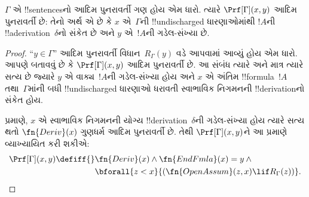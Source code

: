 \documentclass[../../../include/open-logic-section]{subfiles}
\begin{document}
\begin{prop}
  $\Gamma$ એ !!{sentence}sનો આદિમ
  પુનરાવર્તી ગણ હોય એમ ધારો.
  ત્યારે $\Prf[\Gamma](x, y)$ આદિમ
  પુનરાવર્તી છે: તેનો અર્થ એ છે કે
  $x$ એ~$\Gamma$ની
  !!{undischarged} ધારણાઓમાંથી
  $!A$ની !!a{derivation}~$\delta$નો
  સંકેત છે અને $y$ એ~$!A$ની
  ગડેલ-સંખ્યા છે.
\end{prop}

\begin{proof}
  ``$y \in \Gamma$'' આદિમ પુનરાવર્તી
  વિધાન~$R_\Gamma(y)$ વડે આપવામાં
  આવ્યું હોય એમ ધારો. આપણે બતાવવું છે
  કે $\Prf[\Gamma](x, y)$ આદિમ
  પુનરાવર્તી છે. આ સંબંધ ત્યારે અને
  માત્ર ત્યારે સત્ય છે જ્યારે $y$ એ
  વાક્ય~$!A$ની ગડેલ-સંખ્યા હોય અને
  $x$ એ અંતિમ !!{formula}~$!A$
  તથા~$\Gamma$માંની બધી
  !!{undischarged} ધારણાઓ ધરાવતી
  સ્વાભાવિક નિગમનની
  !!{derivation}નો સંકેત હોય.

   પ્રમાણે, $x$ એ
  સ્વાભાવિક નિગમનની યોગ્ય
  !!{derivation}~$\delta$ની ગડેલ-સંખ્યા
  હોય ત્યારે સત્ય થતો
  $\fn{Deriv}(x)$ ગુણધર્મ આદિમ
  પુનરાવર્તી છે. તેથી
  $\Prf[\Gamma](x, y)$ને આ પ્રમાણે
  વ્યાખ્યાયિત કરી શકીએ:
  \begin{align*}
    \Prf[\Gamma](x, y) \defiff {}
    & \fn{Deriv}(x) \land \fn{EndFmla}(x) = y \land {} \\
    & \bforall{z < x}{(\fn{OpenAssum}(z, x) \lif R_\Gamma(z))}.
  \end{align*}
\end{proof}
\end{document}
